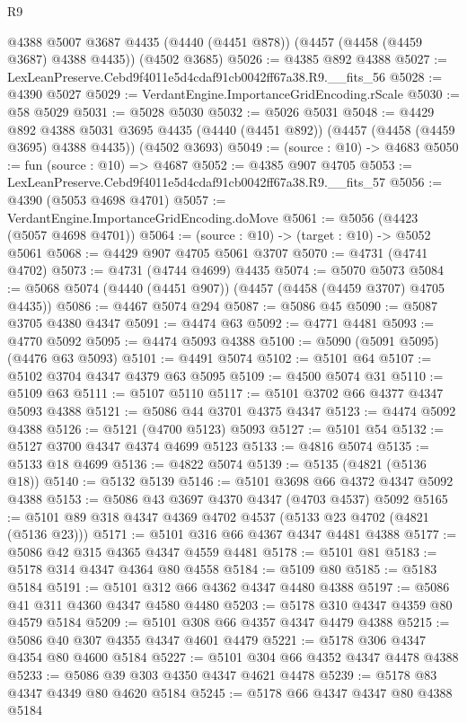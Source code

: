 \begin{lexlean}{R9}
\begin{coremodule}
    @4388
    @5007
    @3687
    @4435
    (@4440 (@4451 @878))
    (@4457 (@4458 (@4459 @3687) @4388 @4435))
    (@4502 @3685)
@5026 := @4385 @892 @4388
@5027 := LexLeanPreserve.Cebd9f4011e5d4cdaf91cb0042ff67a38.R9.__fits_56
@5028 := @4390 @5027
@5029 := VerdantEngine.ImportanceGridEncoding.rScale
@5030 := @58 @5029
@5031 := @5028 @5030
@5032 := @5026 @5031
@5048 := @4429
    @892
    @4388
    @5031
    @3695
    @4435
    (@4440 (@4451 @892))
    (@4457 (@4458 (@4459 @3695) @4388 @4435))
    (@4502 @3693)
@5049 := (source : @10) -> @4683
@5050 := fun (source : @10) => @4687
@5052 := @4385 @907 @4705
@5053 := LexLeanPreserve.Cebd9f4011e5d4cdaf91cb0042ff67a38.R9.__fits_57
@5056 := @4390 (@5053 @4698 @4701)
@5057 := VerdantEngine.ImportanceGridEncoding.doMove
@5061 := @5056 (@4423 (@5057 @4698 @4701))
@5064 := (source : @10) -> (target : @10) -> @5052 @5061
@5068 := @4429 @907 @4705 @5061 @3707
@5070 := @4731 (@4741 @4702)
@5073 := @4731 (@4744 @4699) @4435
@5074 := @5070 @5073
@5084 := @5068 @5074 (@4440 (@4451 @907)) (@4457 (@4458 (@4459 @3707) @4705 @4435))
@5086 := @4467 @5074 @294
@5087 := @5086 @45
@5090 := @5087 @3705 @4380 @4347
@5091 := @4474 @63
@5092 := @4771 @4481
@5093 := @4770 @5092
@5095 := @4474 @5093 @4388
@5100 := @5090 (@5091 @5095) (@4476 @63 @5093)
@5101 := @4491 @5074
@5102 := @5101 @64
@5107 := @5102 @3704 @4347 @4379 @63 @5095
@5109 := @4500 @5074 @31
@5110 := @5109 @63
@5111 := @5107 @5110
@5117 := @5101 @3702 @66 @4377 @4347 @5093 @4388
@5121 := @5086 @44 @3701 @4375 @4347
@5123 := @4474 @5092 @4388
@5126 := @5121 (@4700 @5123) @5093
@5127 := @5101 @54
@5132 := @5127 @3700 @4347 @4374 @4699 @5123
@5133 := @4816 @5074
@5135 := @5133 @18 @4699
@5136 := @4822 @5074
@5139 := @5135 (@4821 (@5136 @18))
@5140 := @5132 @5139
@5146 := @5101 @3698 @66 @4372 @4347 @5092 @4388
@5153 := @5086 @43 @3697 @4370 @4347 (@4703 @4537) @5092
@5165 := @5101 @89 @318 @4347 @4369 @4702 @4537 (@5133 @23 @4702 (@4821 (@5136 @23)))
@5171 := @5101 @316 @66 @4367 @4347 @4481 @4388
@5177 := @5086 @42 @315 @4365 @4347 @4559 @4481
@5178 := @5101 @81
@5183 := @5178 @314 @4347 @4364 @80 @4558
@5184 := @5109 @80
@5185 := @5183 @5184
@5191 := @5101 @312 @66 @4362 @4347 @4480 @4388
@5197 := @5086 @41 @311 @4360 @4347 @4580 @4480
@5203 := @5178 @310 @4347 @4359 @80 @4579 @5184
@5209 := @5101 @308 @66 @4357 @4347 @4479 @4388
@5215 := @5086 @40 @307 @4355 @4347 @4601 @4479
@5221 := @5178 @306 @4347 @4354 @80 @4600 @5184
@5227 := @5101 @304 @66 @4352 @4347 @4478 @4388
@5233 := @5086 @39 @303 @4350 @4347 @4621 @4478
@5239 := @5178 @83 @4347 @4349 @80 @4620 @5184
@5245 := @5178 @66 @4347 @4347 @80 @4388 @5184

\end{coremodule}
\end{lexlean}
